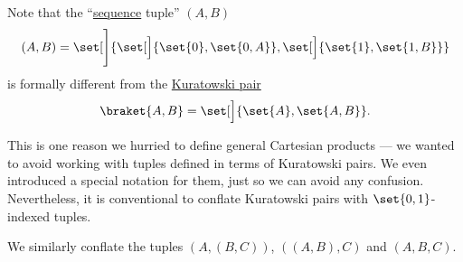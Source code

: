 \begin{remark}\label{rem:kuratowski_pairs_and_tuples}
  Note that the \enquote{\hyperref[def:sequence]{sequence} tuple} \( (A, B) \)
  \begin{equation*}
    (A, B) = \set[\Bigg]{ \set[\Big]{ \set{ 0 }, \set{ 0, A } }, \set[\Big]{ \set{ 1 }, \set{ 1, B } } }
  \end{equation*}
  is formally different from the \hyperref[def:cartesian_product/kuratowski_pair]{Kuratowski pair}
  \begin{equation*}
    \braket{ A, B } = \set[\Big]{ \set{ A }, \set{ A, B } }.
  \end{equation*}

  This is one reason we hurried to define general Cartesian products --- we wanted to avoid working with tuples defined in terms of Kuratowski pairs. We even introduced a special notation for them, just so we can avoid any confusion. Nevertheless, it is conventional to conflate Kuratowski pairs with \( \set{ 0, 1 } \)-indexed tuples.

  We similarly conflate the tuples \( (A, (B, C)) \), \( ((A, B), C) \) and \( (A, B, C) \).
\end{remark}

\medskip

